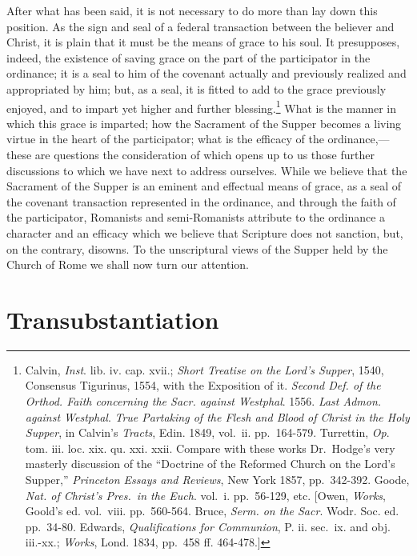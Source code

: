 \documentclass[english,]{book}
\begin{document}
After what has been said, it is not necessary to do more than lay down this position. As the sign and seal of a federal transaction between the believer and Christ, it is plain that it must be the means of grace to his soul. It presupposes, indeed, the existence of saving grace on the part of the participator in the ordinance; it is a seal to him of the covenant actually and previously realized and appropriated by him; but, as a seal, it is fitted to add to the grace previously enjoyed, and to impart yet higher and further blessing.\footnote{Calvin, \emph{Inst}. lib. iv. cap. xvii.; \emph{Short Treatise on the Lord's Supper}, 1540, Consensus Tigurinus, 1554, with the Exposition of it. \emph{Second Def. of the Orthod. Faith concerning the Sacr. against Westphal}. 1556. \emph{Last Admon. against Westphal}. \emph{True Partaking of the Flesh and Blood of Christ in the Holy Supper}, in Calvin's \emph{Tracts}, Edin. 1849, vol.~ii. pp.~164-579. Turrettin, \emph{Op}. tom. iii. loc. xix. qu. xxi. xxii. Compare with these works Dr.~Hodge's very masterly discussion of the ``Doctrine of the Reformed Church on the Lord's Supper,'' \emph{Princeton Essays and Reviews}, New York 1857, pp.~342-392. Goode, \emph{Nat. of Christ's Pres.~in the Euch}. vol.~i. pp.~56-129, etc. {[}Owen, \emph{Works}, Goold's ed. vol.~viii. pp.~560-564. Bruce, \emph{Serm. on the Sacr}. Wodr. Soc. ed. pp.~34-80. Edwards, \emph{Qualifications for Communion}, P. ii. sec.~ix. and obj. iii.-xx.; \emph{Works}, Lond. 1834, pp.~458 ff. 464-478.{]}} What is the manner in which this grace is imparted; how the Sacrament of the Supper becomes a living virtue in the heart of the participator; what is the efficacy of the ordinance,---these are questions the consideration of which opens up to us those further discussions to which we have next to address ourselves. While we believe that the Sacrament of the Supper is an eminent and effectual means of grace, as a seal of the covenant transaction represented in the ordinance, and through the faith of the participator, Romanists and semi-Romanists attribute to the ordinance a character and an efficacy which we believe that Scripture does not sanction, but, on the contrary, disowns. To the unscriptural views of the Supper held by the Church of Rome we shall now turn our attention.

\hypertarget{transubstantiation}{%
\section{Transubstantiation}\label{transubstantiation}}
\end{document}
